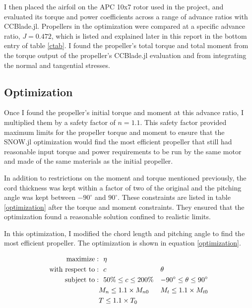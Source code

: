 \documentclass[journal ]{new-aiaa}
\begin{document}
I then placed the airfoil on the APC 10x7 rotor used in the project, and evaluated its torque and power coefficients across a range of advance ratios with CCBlade.jl. Propellers in the optimization were compared at a specific advance ratio, $J=0.472$, which is listed and explained later in this report in the bottom entry of table \ref{ctab}. I found the propeller's total torque and total moment from the torque output of the propeller's CCBlade.jl evaluation and from integrating the normal and tangential stresses.

\subsection{Optimization}

Once I found the propeller's initial torque and moment at this advance ratio, I multiplied them by a safety factor of $n=1.1$. This safety factor provided maximum limits for the propeller torque and moment to ensure that the SNOW.jl optimization would find the most efficient propeller that still had reasonable input torque and power requirements to be run by the same motor and made of the same materials as the initial propeller.

In addition to restrictions on the moment and torque mentioned previously, the cord thickness was kept within a factor of two of the original and the pitching angle was kept between $-90^{\circ}$ and $90^{\circ}$. These constraints are listed in table \ref{optimization} after the torque and moment constraints. They ensured that the optimization found a reasonable solution confined to realistic limits.

In this optimization, I modified the chord length and pitching angle to find the most efficient propeller. The optimization is shown in equation \ref{optimization}. 

\begin{equation}
	\label{optimization}
	\begin{aligned}
		\mathrm{maximize:}& ~~ \eta \\
		\mathrm{with~respect~to:}& ~~ c & \multicolumn{1}{l}{$\theta$} \\
		\mathrm{subject~to:}& ~~ 50\% \leq c \leq 200\% & -90^{\circ} \leq \theta \leq 90^{\circ} \\
		& M_{n} \leq 1.1 \times M_{n0} & M_{t} \leq 1.1 \times M_{t0} \\
		& T \leq 1.1 \times T_{0} \\
	\end{aligned}
\end{equation}
\end{document}
